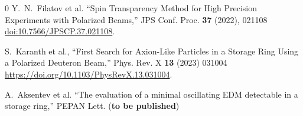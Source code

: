 \documentclass{article}
\begin{document}
	
	
	
	\begin{thebibliography}{0}
		Y.~N.~Filatov et al. ``Spin Transparency Method for High Precision Experiments with Polarized Beams,''
		JPS Conf. Proc. \textbf{37} (2022), 021108
		\url{doi:10.7566/JPSCP.37.021108}.
		
		S.~Karanth et al., ``First Search for Axion-Like Particles in a Storage Ring Using a Polarized Deuteron Beam,'' 
		Phys. Rev. X \textbf{13} (2023) 031004
		\url{https://doi.org/10.1103/PhysRevX.13.031004}.
		
		A.~Aksentev et al. ``The evaluation of a minimal oscillating EDM detectable in a storage ring,''
		PEPAN Lett. (\textbf{to be published})
	\end{thebibliography}
	
\end{document}
